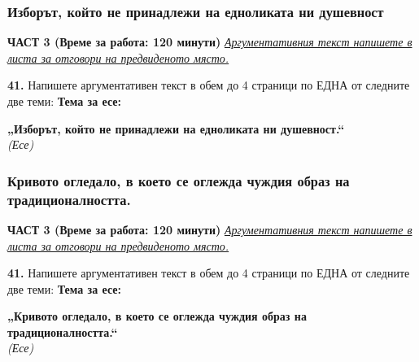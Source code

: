 \documentclass[12pt,a4paper]{article}
\begin{document}
\subsubsection{Изборът, който не принадлежи на едноликата ни душевност}
\vspace{0.5cm}
\begin{center}
\textbf{ЧАСТ 3 (Време за работа: 120 минути)}
\vspace{0.2cm}
{\textit{\underline{Аргументативния текст напишете в листа за отговори на предвиденото място.}}}
\vspace{0.1cm}
\end{center}
\textbf{41.} Напишете аргументативен текст в обем до 4 страници по ЕДНА от следните две теми:
\vspace{0.2cm}
\textbf{Тема за есе:}
\vspace{0.1cm}
\begin{center}
\textbf{„Изборът, който не принадлежи на едноликата ни душевност.“}
\\
\textit{(Есе)}
\end{center}

\subsubsection{Кривото огледало, в което се оглежда чуждия образ на традиционалността.}
\vspace{0.5cm}
\begin{center}
\textbf{ЧАСТ 3 (Време за работа: 120 минути)}
\vspace{0.2cm}
{\textit{\underline{Аргументативния текст напишете в листа за отговори на предвиденото място.}}}
\vspace{0.1cm}
\end{center}
\textbf{41.} Напишете аргументативен текст в обем до 4 страници по ЕДНА от следните две теми:
\vspace{0.2cm}
\textbf{Тема за есе:}
\vspace{0.1cm}
\begin{center}
\textbf{„Кривото огледало, в което се оглежда чуждия образ на традиционалността.“}
\\
\textit{(Есе)}
\end{center}
\end{document}
